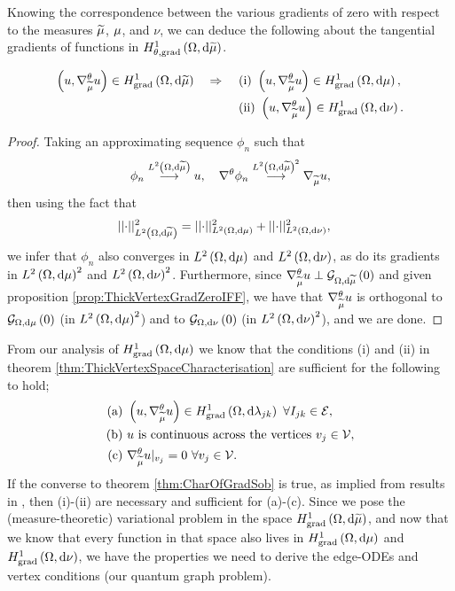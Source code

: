 Knowing the correspondence between the various gradients of zero with respect to the measures $\widetilde{\mu}$, $\mu$, and $\nu$, we can deduce the following about the tangential gradients of functions in $H^1_{\theta, \mathrm{grad}}\left( \Omega, \mathrm{d}\widetilde{\mu} \right)$.
\begin{theorem} \label{thm:ThickVertexSpaceCharacterisation}
	\begin{align*}
		\left( u, \nabla^{\theta}_{\widetilde{\mu}}u \right)\in H^1_\mathrm{grad}\left( \Omega, \mathrm{d}\widetilde{\mu} \right) \quad\Rightarrow\quad
		& \ \text{(i)} \ \left( u, \nabla^{\theta}_{\widetilde{\mu}}u \right)\in H^1_\mathrm{grad}\left( \Omega, \mathrm{d}\mu \right), \\
		& \ \text{(ii)} \ \left( u, \nabla^{\theta}_{\widetilde{\mu}}u \right)\in H^1_\mathrm{grad}\left( \Omega, \mathrm{d}\nu \right). \\
	\end{align*}
\end{theorem}
\begin{proof}
	Taking an approximating sequence $\phi_n$ such that
	\begin{align*}
		\phi_n \overset{L^{2}\left( \Omega,\mathrm{d}\widetilde{\mu} \right)}{\longrightarrow} u, \quad \nabla^{\theta}\phi_n\overset{L^{2}\left( \Omega,\mathrm{d}\widetilde{\mu} \right)^2}{\longrightarrow}\nabla_{\widetilde{\mu}}u,
	\end{align*}
	then using the fact that
	\begin{align*}
		\lvert\lvert \cdot \rvert\rvert_{L^{2}\left( \Omega,\mathrm{d}\widetilde{\mu} \right)}^2 &= \lvert\lvert \cdot \rvert\rvert_{L^{2}\left( \Omega,\mathrm{d}\mu \right)}^2 + \lvert\lvert \cdot \rvert\rvert_{L^{2}\left( \Omega,\mathrm{d}\nu \right)}^2,
	\end{align*}
	we infer that $\phi_n$ also converges in $L^{2}\left( \Omega,\mathrm{d}\mu \right)$ and $L^{2}\left( \Omega,\mathrm{d}\nu \right)$, as do its gradients in $L^{2}\left( \Omega,\mathrm{d}\mu \right)^2$ and $L^{2}\left( \Omega,\mathrm{d}\nu \right)^2$.
	Furthermore, since $\nabla^{\theta}_{\widetilde{\mu}}u \perp \mathcal{G}_{ \Omega, \mathrm{d}\widetilde{\mu}}\left( 0 \right)$ and given proposition \ref{prop:ThickVertexGradZeroIFF}, we have that $\nabla^{\theta}_{\widetilde{\mu}}u$ is orthogonal to $\mathcal{G}_{ \Omega, \mathrm{d}\mu}\left( 0 \right)$ (in $L^{2}\left( \Omega,\mathrm{d}\mu \right)^2$) and to $\mathcal{G}_{ \Omega, \mathrm{d}\nu}\left( 0 \right)$ (in $L^{2}\left( \Omega,\mathrm{d}\nu \right)^2$), and we are done. 
\end{proof}
From our analysis of $H^1_\mathrm{grad}\left( \Omega, \mathrm{d}\mu \right)$ we know that the conditions (i) and (ii) in theorem \ref{thm:ThickVertexSpaceCharacterisation} are sufficient for the following to hold;
\begin{align*}
		\text{(a)} \ & \bracs{u, \tgrad_{\dddmes}u}\in\gradSob{\ddom}{\lambda_{jk}} \ \forall I_{jk}\in\edgeSet, \\
		\text{(b)} \ & u \text{ is continuous across the vertices} \ v_j\in\vertSet, \\
		\text{(c)} \ & \tgrad_{\dddmes}u\vert_{v_j} = 0 \ \forall v_j\in\vertSet.
\end{align*}
If the converse to theorem \ref{thm:CharOfGradSob} is true, as implied from results in \cite{zhikov2002homogenization}, then (i)-(ii) are necessary and sufficient for (a)-(c).
Since we pose the (measure-theoretic) variational problem in the space $H^1_\mathrm{grad}\left( \Omega, \mathrm{d}\widetilde{\mu} \right)$, and now that we know that every function in that space also lives in $H^1_\mathrm{grad}\left( \Omega, \mathrm{d}\mu \right)$ and $H^1_\mathrm{grad}\left( \Omega, \mathrm{d}\nu \right)$, we have the properties we need to derive the edge-ODEs and vertex conditions (our quantum graph problem).